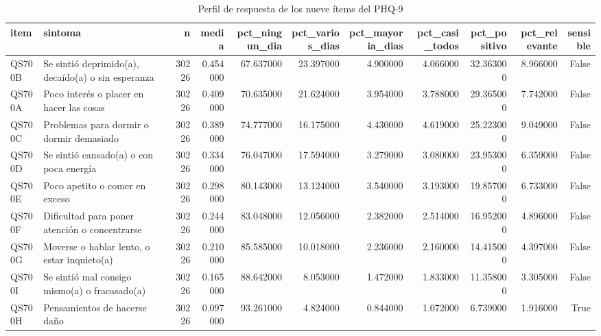 \begin{table}[htbp]
\caption{Perfil de respuesta de los nueve ítems del PHQ-9}
\label{tab:tabla_10_items_phq9}
\begin{tabular}{llrrrrrrrrr}
\toprule
item & sintoma & n & media & pct\_ningun\_dia & pct\_varios\_dias & pct\_mayoria\_dias & pct\_casi\_todos & pct\_positivo & pct\_relevante & sensible \\
\midrule
QS700B & Se sintió deprimido(a), decaído(a) o sin esperanza & 30226 & 0.454000 & 67.637000 & 23.397000 & 4.900000 & 4.066000 & 32.363000 & 8.966000 & False \\
QS700A & Poco interés o placer en hacer las cosas & 30226 & 0.409000 & 70.635000 & 21.624000 & 3.954000 & 3.788000 & 29.365000 & 7.742000 & False \\
QS700C & Problemas para dormir o dormir demasiado & 30226 & 0.389000 & 74.777000 & 16.175000 & 4.430000 & 4.619000 & 25.223000 & 9.049000 & False \\
QS700D & Se sintió cansado(a) o con poca energía & 30226 & 0.334000 & 76.047000 & 17.594000 & 3.279000 & 3.080000 & 23.953000 & 6.359000 & False \\
QS700E & Poco apetito o comer en exceso & 30226 & 0.298000 & 80.143000 & 13.124000 & 3.540000 & 3.193000 & 19.857000 & 6.733000 & False \\
QS700F & Dificultad para poner atención o concentrarse & 30226 & 0.244000 & 83.048000 & 12.056000 & 2.382000 & 2.514000 & 16.952000 & 4.896000 & False \\
QS700G & Moverse o hablar lento, o estar inquieto(a) & 30226 & 0.210000 & 85.585000 & 10.018000 & 2.236000 & 2.160000 & 14.415000 & 4.397000 & False \\
QS700I & Se sintió mal consigo mismo(a) o fracasado(a) & 30226 & 0.165000 & 88.642000 & 8.053000 & 1.472000 & 1.833000 & 11.358000 & 3.305000 & False \\
QS700H & Pensamientos de hacerse daño & 30226 & 0.097000 & 93.261000 & 4.824000 & 0.844000 & 1.072000 & 6.739000 & 1.916000 & True \\
\bottomrule
\end{tabular}
\end{table}
